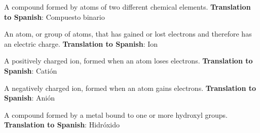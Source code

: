 \begin{vocabulary}
    A compound formed by atoms of two different chemical elements. \newline
    \textbf{Translation to Spanish}: Compuesto binario
\end{vocabulary}

\begin{vocabulary}[Ion]
    An atom, or group of atoms, that has gained or lost electrons and therefore has an electric charge. \newline
    \textbf{Translation to Spanish}: Ion
\end{vocabulary}

\begin{vocabulary}[Cation]
    A positively charged ion, formed when an atom loses electrons. \newline
    \textbf{Translation to Spanish}: Catión
\end{vocabulary}

\begin{vocabulary}[Anion]
    A negatively charged ion, formed when an atom gains electrons. \newline
    \textbf{Translation to Spanish}: Anión
\end{vocabulary}

\begin{vocabulary}[Hydroxide]
    A compound formed by a metal bound to one or more hydroxyl groups. \newline
    \textbf{Translation to Spanish}: Hidróxido
\end{vocabulary}
